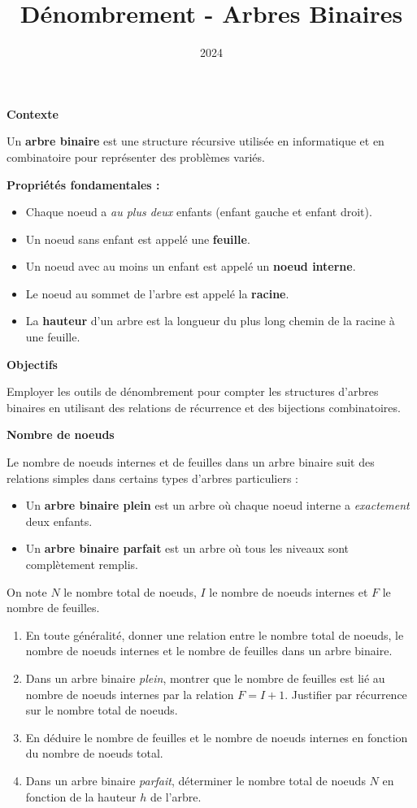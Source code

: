 \documentclass[10pt,a4paper]{article}
\title{Dénombrement - Arbres Binaires}
\author{}
\date{2024}
\begin{document}
\textbf{Contexte}

Un \textbf{arbre binaire} est une structure récursive utilisée en informatique et en combinatoire
pour représenter des problèmes variés.

\textbf{Propriétés fondamentales :}
\begin{itemize}
    \item Chaque noeud a  \textit{au plus deux} enfants (enfant gauche et enfant droit).
    \item Un noeud sans enfant est appelé une \textbf{feuille}.
    \item Un noeud avec au moins un enfant est appelé un \textbf{noeud interne}.
    \item Le noeud au sommet de l'arbre est appelé la \textbf{racine}.
    \item La \textbf{hauteur} d'un arbre est la longueur du plus long chemin de la racine à une
    feuille.
\end{itemize}

%

\bigskip
\textbf{Objectifs}

Employer les  outils de dénombrement pour compter les structures d'arbres binaires en utilisant
des relations de récurrence et des bijections combinatoires.

\q \textbf{Nombre de noeuds}

Le nombre de noeuds internes et de feuilles dans un arbre binaire suit des relations simples dans
certains types d'arbres particuliers :
\begin{itemize}
     \item Un \textbf{arbre binaire plein} est un arbre où chaque noeud interne a
    \textit{exactement} deux enfants.
    \item Un \textbf{arbre binaire parfait} est un arbre où tous les niveaux sont complètement
    remplis.
\end{itemize}
On note \( N \) le nombre total de noeuds, \( I \) le nombre de noeuds internes et \( F \) le nombre
de feuilles.

\begin{enumerate}
    \item En toute généralité, donner une relation entre le nombre total de noeuds, le nombre de
    noeuds internes et le nombre de feuilles dans un arbre binaire.
    \item Dans un arbre binaire \textit{plein}, montrer que le nombre de feuilles est lié au nombre
    de noeuds internes par la relation \( F = I + 1 \). Justifier par récurrence sur le nombre total
    de noeuds.
    \item En déduire le nombre de feuilles et le nombre de noeuds internes en fonction du nombre de
    noeuds total.
    \item Dans un arbre binaire \textit{parfait}, déterminer le nombre total de noeuds \( N \) en
    fonction de la hauteur \( h \) de l'arbre.
\end{enumerate}
\end{document}
